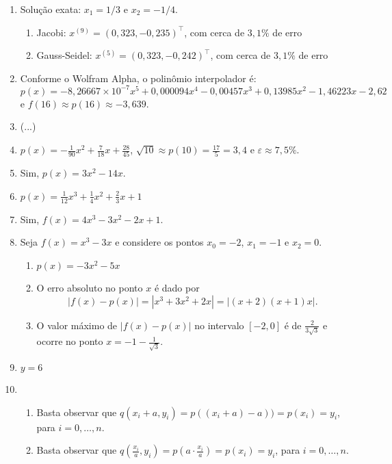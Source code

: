 \documentclass[12pt,a4paper]{article}
\newcommand{\fixme}{{\color{red}(...)}}
\begin{document}
\begin{enumerate}
\item Solução exata: $x_1 = 1/3$ e $x_2 = -1/4$.
\begin{enumerate}
\item Jacobi: $x^{(9)} = (0,323, -0,235)^\intercal$, com cerca de $3,1\%$ de erro
\item Gauss-Seidel: $x^{(5)} = (0,323, -0,242)^\intercal$, com cerca de $3,1\%$ de erro
\end{enumerate}
\item Conforme o Wolfram Alpha, o polinômio interpolador é:
\[
p(x) = -8,\!26667 \times 10^{-7} x^5 + 0,\!000094 x^4 - 0,\!00457 x^3 + 0,\!13985 x^2 - 1,\!46223 x - 2,\!62
\]
e $f(16) \approx p(16) \approx -3,\!639$.
\item \fixme
\item $p(x) = -\frac{1}{90}x^2 + \frac{7}{18} x + \frac{28}{45}$, $\sqrt{10} \approx p(10) = \frac{17}{5} = 3,\!4$ e $\varepsilon \approx 7,\!5\%$.
\item Sim, $p(x) = 3x^2 - 14x$.
\item $p(x) = \frac{1}{12}x^3 + \frac{1}{4}x^2 + \frac{2}{3} x + 1$
\item Sim, $f(x) = 4x^3 - 3x^2 - 2x + 1$.
\item Seja $f(x) = x^3 - 3x$ e considere os pontos $x_0 = -2$, $x_1 = -1$ e $x_2 = 0$.
\begin{enumerate}
\item $p(x) = -3x^2 - 5x$
\item O erro absoluto no ponto $x$ é dado por
\[
|f(x) - p(x)| = |x^3 + 3x^2 + 2x| = |(x + 2) (x + 1) x|.
\]

\item O valor máximo de $|f(x) - p(x)|$ no intervalo $[-2, 0]$ é de $\frac{2}{3 \sqrt{3}}$ e ocorre no ponto $x = -1 - \frac{1}{\sqrt{3}}$.
\end{enumerate}
\item $y=6$
\item
\begin{enumerate}
\item Basta observar que $q(x_i + a, y_i) = p((x_i + a)-a)) = p(x_i) = y_i$, para $i = 0, \ldots, n$.
\item Basta observar que $q(\frac{x_i}{a}, y_i) = p(a \cdot \frac{x_i}{a}) = p(x_i) = y_i$, para $i = 0, \ldots, n$.
\end{enumerate}


\end{enumerate}
\end{document}
